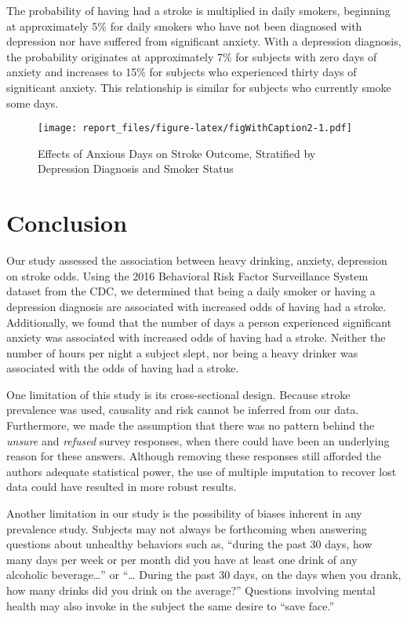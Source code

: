 \documentclass[11pt,]{article}
\begin{document}
The probability of having had a stroke is multiplied in daily smokers,
beginning at approximately 5\% for daily smokers who have not been
diagnosed with depression nor have suffered from significant anxiety.
With a depression diagnosis, the probability originates at approximately
7\% for subjects with zero days of anxiety and increases to 15\% for
subjects who experienced thirty days of signiticant anxiety. This
relationship is similar for subjects who currently smoke some days.

\begin{figure}
\centering
\texttt{[image: report\_files/figure-latex/figWithCaption2-1.pdf]}
\caption{Effects of Anxious Days on Stroke Outcome, Stratified by
Depression Diagnosis and Smoker Status}
\end{figure}

\section{Conclusion}\label{conclusion}

Our study assessed the association between heavy drinking, anxiety,
depression on stroke odds. Using the 2016 Behavioral Risk Factor
Surveillance System dataset from the CDC, we determined that being a
daily smoker or having a depression diagnosis are associated with
increased odds of having had a stroke. Additionally, we found that the
number of days a person experienced significant anxiety was associated
with increased odds of having had a stroke. Neither the number of hours
per night a subject slept, nor being a heavy drinker was associated with
the odds of having had a stroke.

One limitation of this study is its cross-sectional design. Because
stroke prevalence was used, causality and risk cannot be inferred from
our data. Furthermore, we made the assumption that there was no pattern
behind the \emph{unsure} and \emph{refused} survey responses, when there
could have been an underlying reason for these answers. Although
removing these responses still afforded the authors adequate statistical
power, the use of multiple imputation to recover lost data could have
resulted in more robust results.

Another limitation in our study is the possibility of biases inherent in
any prevalence study. Subjects may not always be forthcoming when
answering questions about unhealthy behaviors such as, ``during the past
30 days, how many days per week or per month did you have at least one
drink of any alcoholic beverage\ldots{}'' or ``\ldots{} During the past
30 days, on the days when you drank, how many drinks did you drink on
the average?'' Questions involving mental health may also invoke in the
subject the same desire to ``save face.''
\end{document}
